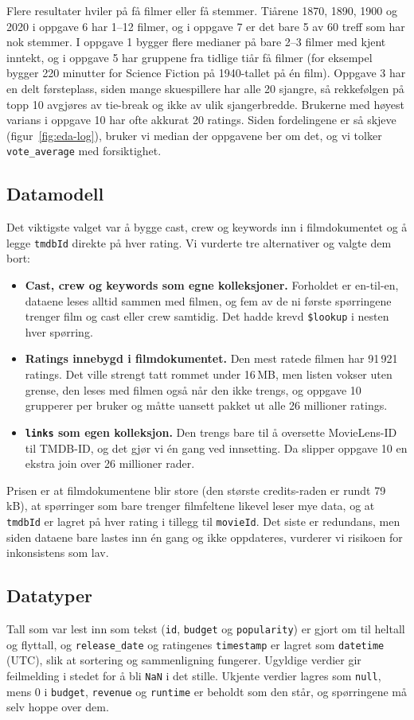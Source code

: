 \documentclass[11pt,a4paper]{article}
\begin{document}
Flere resultater hviler på få filmer eller få stemmer. Tiårene 1870, 1890, 1900 og 2020 i oppgave 6 har 1--12 filmer, og i oppgave 7 er det bare 5 av 60 treff som har nok stemmer. I oppgave 1 bygger flere medianer på bare 2--3 filmer med kjent inntekt, og i oppgave 5 har gruppene fra tidlige tiår få filmer (for eksempel bygger 220 minutter for Science Fiction på 1940-tallet på én film). Oppgave 3 har en delt førsteplass, siden mange skuespillere har alle 20 sjangre, så rekkefølgen på topp 10 avgjøres av tie-break og ikke av ulik sjangerbredde. Brukerne med høyest varians i oppgave 10 har ofte akkurat 20 ratings. Siden fordelingene er så skjeve (figur~\ref{fig:eda-log}), bruker vi median der oppgavene ber om det, og vi tolker \texttt{vote\_average} med forsiktighet.

\subsection{Datamodell}
Det viktigste valget var å bygge cast, crew og keywords inn i filmdokumentet og å legge \texttt{tmdbId} direkte på hver rating. Vi vurderte tre alternativer og valgte dem bort:
\begin{itemize}
  \item \textbf{Cast, crew og keywords som egne kolleksjoner.} Forholdet er en-til-en, dataene leses alltid sammen med filmen, og fem av de ni første spørringene trenger film og cast eller crew samtidig. Det hadde krevd \texttt{\$lookup} i nesten hver spørring.
  \item \textbf{Ratings innebygd i filmdokumentet.} Den mest ratede filmen har 91\,921 ratings. Det ville strengt tatt rommet under 16\,MB, men listen vokser uten grense, den leses med filmen også når den ikke trengs, og oppgave 10 grupperer per bruker og måtte uansett pakket ut alle 26 millioner ratings.
  \item \textbf{\texttt{links} som egen kolleksjon.} Den trengs bare til å oversette MovieLens-ID til TMDB-ID, og det gjør vi én gang ved innsetting. Da slipper oppgave 10 en ekstra join over 26 millioner rader.
\end{itemize}
Prisen er at filmdokumentene blir store (den største credits-raden er rundt 79\,kB), at spørringer som bare trenger filmfeltene likevel leser mye data, og at \texttt{tmdbId} er lagret på hver rating i tillegg til \texttt{movieId}. Det siste er redundans, men siden dataene bare lastes inn én gang og ikke oppdateres, vurderer vi risikoen for inkonsistens som lav.

\subsection{Datatyper}
Tall som var lest inn som tekst (\texttt{id}, \texttt{budget} og \texttt{popularity}) er gjort om til heltall og flyttall, og \texttt{release\_date} og ratingenes \texttt{timestamp} er lagret som \texttt{datetime} (UTC), slik at sortering og sammenligning fungerer. Ugyldige verdier gir feilmelding i stedet for å bli \texttt{NaN} i det stille. Ukjente verdier lagres som \texttt{null}, mens 0 i \texttt{budget}, \texttt{revenue} og \texttt{runtime} er beholdt som den står, og spørringene må selv hoppe over dem.
\end{document}
